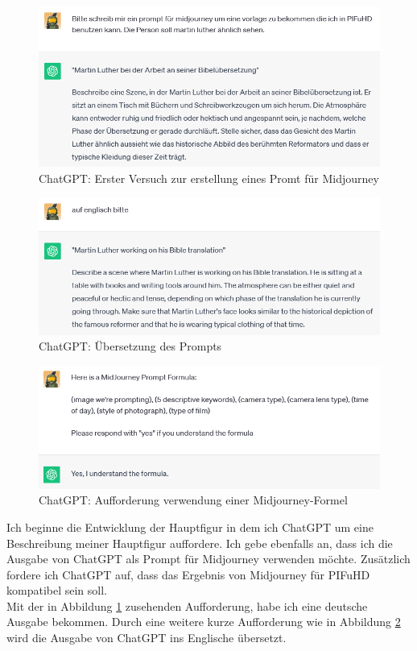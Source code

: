 \begin{figure}[h]
	\centering
	\includegraphics[width=14cm]{BilderFuerBA/02.png}
	\caption{ChatGPT: Erster Versuch zur erstellung eines Promt für Midjourney}
	\label{ChatGPT_erster_Versuch_Midjourney_Promt}
\end{figure}
\begin{figure}[h]
	\centering
	\includegraphics[width=14cm]{BilderFuerBA/03.png}
	\caption{ChatGPT: Übersetzung des Prompts}
	\label{ChatGPT_übersetzen}
\end{figure}
\begin{figure}[h]
	\centering
	\includegraphics[width=14cm]{BilderFuerBA/04.png}
	\caption{ChatGPT: Aufforderung verwendung einer Midjourney-Formel}
	\label{chatgpt-ptompt-Midjourney-04}
\end{figure}
Ich beginne die Entwicklung der Hauptfigur in dem ich ChatGPT um eine Beschreibung meiner Hauptfigur auffordere. Ich gebe ebenfalls an, dass ich die Ausgabe von ChatGPT als Prompt für Midjourney verwenden möchte. Zusätzlich fordere ich ChatGPT auf, dass das Ergebnis von Midjourney für PIFuHD kompatibel sein soll.
\\
Mit der in Abbildung \ref{ChatGPT_erster_Versuch_Midjourney_Promt} zusehenden Aufforderung, habe ich eine deutsche Ausgabe bekommen. Durch eine weitere kurze Aufforderung wie in Abbildung \ref{ChatGPT_übersetzen} wird die Ausgabe von ChatGPT ins Englische übersetzt.
